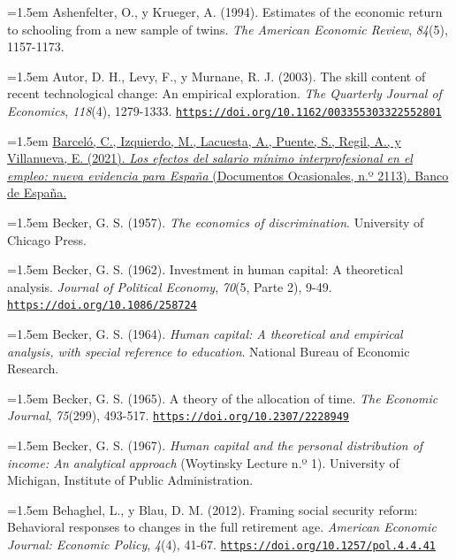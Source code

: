 \documentclass[10pt,a4paper]{article}
\begin{document}
\noindent\hangindent=1.5em Ashenfelter, O., y Krueger, A. (1994). Estimates of the economic return to schooling from a new sample of twins. \textit{The American Economic Review}, \textit{84}(5), 1157-1173.

\noindent\hangindent=1.5em Autor, D. H., Levy, F., y Murnane, R. J. (2003). The skill content of recent technological change: An empirical exploration. \textit{The Quarterly Journal of Economics}, \textit{118}(4), 1279-1333. \href{https://doi.org/10.1162/003355303322552801}{\nolinkurl{https://doi.org/10.1162/003355303322552801}}

\noindent\hangindent=1.5em \href{https://repositorio.bde.es/handle/123456789/16842}{Barceló, C., Izquierdo, M., Lacuesta, A., Puente, S., Regil, A., y Villanueva, E. (2021). \textit{Los efectos del salario mínimo interprofesional en el empleo: nueva evidencia para España} (Documentos Ocasionales, n.º 2113). Banco de España.}

\noindent\hangindent=1.5em Becker, G. S. (1957). \textit{The economics of discrimination}. University of Chicago Press.

\noindent\hangindent=1.5em Becker, G. S. (1962). Investment in human capital: A theoretical analysis. \textit{Journal of Political Economy}, \textit{70}(5, Parte 2), 9-49. \href{https://doi.org/10.1086/258724}{\nolinkurl{https://doi.org/10.1086/258724}}

\noindent\hangindent=1.5em Becker, G. S. (1964). \textit{Human capital: A theoretical and empirical analysis, with special reference to education}. National Bureau of Economic Research.

\noindent\hangindent=1.5em Becker, G. S. (1965). A theory of the allocation of time. \textit{The Economic Journal}, \textit{75}(299), 493-517. \href{https://doi.org/10.2307/2228949}{\nolinkurl{https://doi.org/10.2307/2228949}}

\noindent\hangindent=1.5em Becker, G. S. (1967). \textit{Human capital and the personal distribution of income: An analytical approach} (Woytinsky Lecture n.º 1). University of Michigan, Institute of Public Administration.

\noindent\hangindent=1.5em Behaghel, L., y Blau, D. M. (2012). Framing social security reform: Behavioral responses to changes in the full retirement age. \textit{American Economic Journal: Economic Policy}, \textit{4}(4), 41-67. \href{https://doi.org/10.1257/pol.4.4.41}{\nolinkurl{https://doi.org/10.1257/pol.4.4.41}}
\end{document}
